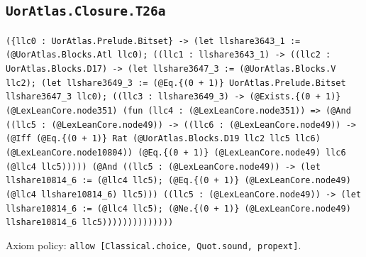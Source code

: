 \documentclass[11pt]{article}
\begin{document}
\subsection*{\texttt{UorAtlas.Closure.T26a}}
\noindent\texttt{(\{llc0 : UorAtlas.Prelude.Bitset\} -> (let llshare3643\_1 := (@UorAtlas.Blocks.Atl llc0); ((llc1 : llshare3643\_1) -> ((llc2 : UorAtlas.Blocks.D17) -> (let llshare3647\_3 := (@UorAtlas.Blocks.V llc2); (let llshare3649\_3 := (@Eq.\{(0 + 1)\} UorAtlas.Prelude.Bitset llshare3647\_3 llc0); ((llc3 : llshare3649\_3) -> (@Exists.\{(0 + 1)\} (@LexLeanCore.node351) (fun (llc4 : (@LexLeanCore.node351)) => (@And ((llc5 : (@LexLeanCore.node49)) -> ((llc6 : (@LexLeanCore.node49)) -> (@Iff (@Eq.\{(0 + 1)\} Rat (@UorAtlas.Blocks.D19 llc2 llc5 llc6) (@LexLeanCore.node10804)) (@Eq.\{(0 + 1)\} (@LexLeanCore.node49) llc6 (@llc4 llc5))))) (@And ((llc5 : (@LexLeanCore.node49)) -> (let llshare10814\_6 := (@llc4 llc5); (@Eq.\{(0 + 1)\} (@LexLeanCore.node49) (@llc4 llshare10814\_6) llc5))) ((llc5 : (@LexLeanCore.node49)) -> (let llshare10814\_6 := (@llc4 llc5); (@Ne.\{(0 + 1)\} (@LexLeanCore.node49) llshare10814\_6 llc5))))))))))))))}\par
\noindent Axiom policy: \texttt{allow [Classical.choice, Quot.sound, propext]}.\par
\end{document}
